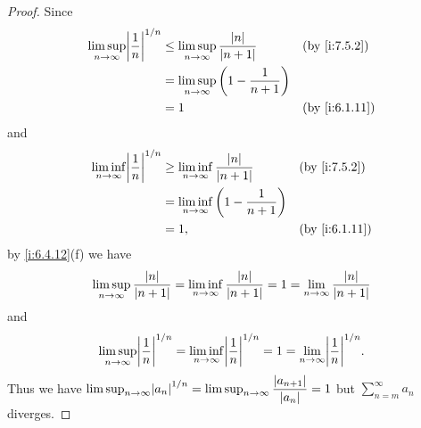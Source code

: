 \begin{proof}
  Since
  \begin{align*}
    \limsup_{n \to \infty} \abs{\dfrac{1}{n}}^{1 / n} & \leq \limsup_{n \to \infty} \dfrac{\abs{n}}{\abs{n + 1}}  &  & \by{i:7.5.2}  \\
                                                      & = \limsup_{n \to \infty} \bigg(1 - \dfrac{1}{n + 1}\bigg)                    \\
                                                      & = 1                                                       &  & \by{i:6.1.11}
  \end{align*}
  and
  \begin{align*}
    \liminf_{n \to \infty} \abs{\dfrac{1}{n}}^{1 / n} & \geq \liminf_{n \to \infty} \dfrac{\abs{n}}{\abs{n + 1}}  &  & \by{i:7.5.2}  \\
                                                      & = \liminf_{n \to \infty} \bigg(1 - \dfrac{1}{n + 1}\bigg)                    \\
                                                      & = 1,                                                      &  & \by{i:6.1.11}
  \end{align*}
  by \cref{i:6.4.12}(f) we have
  \[
    \limsup_{n \to \infty} \dfrac{\left\lvert n\right\rvert}{\left\lvert n + 1\right\rvert} = \liminf_{n \to \infty} \dfrac{\left\lvert n\right\rvert}{\left\lvert n + 1\right\rvert} = 1 = \lim_{n \to \infty} \dfrac{\left\lvert n\right\rvert}{\left\lvert n + 1\right\rvert}
  \]
  and
  \[
    \limsup_{n \to \infty} \abs{\dfrac{1}{n}}^{1 / n} = \liminf_{n \to \infty} \abs{\dfrac{1}{n}}^{1 / n} = 1 = \lim_{n \to \infty} \abs{\dfrac{1}{n}}^{1 / n}.
  \]
  Thus we have \(\limsup_{n \to \infty} \abs{a_n}^{1 / n} = \limsup_{n \to \infty} \dfrac{\abs{a_{n + 1}}}{\abs{a_n}} = 1\) but \(\sum_{n = m}^\infty a_n\) diverges.


\end{proof}

